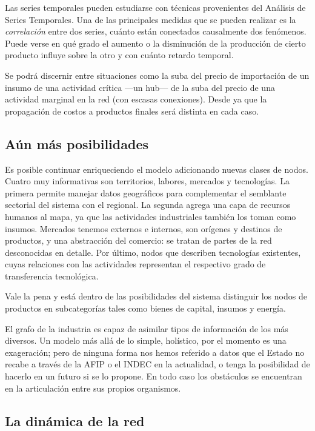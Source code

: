 \documentclass[a4paper]{report}
\begin{document}
Las series temporales pueden estudiarse con técnicas provenientes del Análisis de Series Temporales. Una de las principales medidas que se pueden realizar es la \textit{correlación} entre dos series, cuánto están conectados causalmente dos fenómenos. Puede verse en qué grado el aumento o la disminución de la producción de cierto producto influye sobre la otro y con cuánto retardo temporal.

Se podrá discernir entre situaciones como la suba del precio de importación de un insumo de una actividad crítica —un hub— de la suba del precio de una actividad marginal en la red (con escasas conexiones). Desde ya que la propagación de costos a productos finales será distinta en cada caso.

\subsection*{Aún más posibilidades}

Es posible continuar enriqueciendo el modelo adicionando nuevas clases de nodos. Cuatro muy informativas son territorios, labores, mercados y tecnologías. La primera permite manejar datos geográficos para complementar el semblante sectorial del sistema con el regional. La segunda agrega una capa de recursos humanos al mapa, ya que las actividades industriales también los toman como insumos. Mercados tenemos externos e internos, son orígenes y destinos de productos, y una abstracción del comercio: se tratan de partes de la red desconocidas en detalle. Por último, nodos que describen tecnologías existentes, cuyas relaciones con las actividades representan el respectivo grado de transferencia tecnológica.

Vale la pena y está dentro de las posibilidades del sistema distinguir los nodos de productos en subcategorías tales como bienes de capital, insumos y energía.

El grafo de la industria es capaz de asimilar tipos de información de los más diversos. Un modelo más allá de lo simple, holístico, por el momento es una exageración; pero de ninguna forma nos hemos referido a datos que el Estado no recabe a través de la AFIP o el INDEC en la actualidad, o tenga la posibilidad de hacerlo en un futuro si se lo propone. En todo caso los obstáculos se encuentran en la articulación entre sus propios organismos.

\subsection*{La dinámica de la red}
\end{document}

